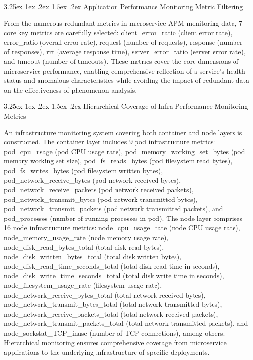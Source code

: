 \documentclass[10pt]{article}
\makeatletter
\renewcommand{\paragraph}{%
    \@startsection{paragraph}{4}{\z@}%
    {3.25ex \@plus1ex \@minus.2ex}%
    {1.5ex \@plus.2ex}%
    {\normalfont\normalsize\itshape}%
}
\makeatother
\begin{document}
\paragraph{Application Performance Monitoring Metric Filtering}

From the numerous redundant metrics in microservice APM monitoring data, 7 core key metrics are carefully selected: client\_error\_ratio (client error rate), error\_ratio (overall error rate), request (number of requests), response (number of responses), rrt (average response time), server\_error\_ratio (server error rate), and timeout (number of timeouts). These metrics cover the core dimensions of microservice performance, enabling comprehensive reflection of a service’s health status and anomalous characteristics while avoiding the impact of redundant data on the effectiveness of phenomenon analysis.

\paragraph{Hierarchical Coverage of Infra Performance Monitoring Metrics}

An infrastructure monitoring system covering both container and node layers is constructed. The container layer includes 9 pod infrastructure metrics: pod\_cpu\_usage (pod CPU usage rate), pod\_memory\_working\_set\_bytes (pod memory working set size), pod\_fs\_reads\_bytes (pod filesystem read bytes), pod\_fs\_writes\_bytes (pod filesystem written bytes), pod\_network\_receive\_bytes (pod network received bytes), pod\_network\_receive\_packets (pod network received packets), pod\_network\_transmit\_bytes (pod network transmitted bytes), pod\_network\_transmit\_packets (pod network transmitted packets), and pod\_processes (number of running processes in pod). The node layer comprises 16 node infrastructure metrics: node\_cpu\_usage\_rate (node CPU usage rate), node\_memory\_usage\_rate (node memory usage rate), node\_disk\_read\_bytes\_total (total disk read bytes), node\_disk\_written\_bytes\_total (total disk written bytes), node\_disk\_read\_time\_seconds\_total (total disk read time in seconds), node\_disk\_write\_time\_seconds\_total (total disk write time in seconds), node\_filesystem\_usage\_rate (filesystem usage rate), node\_network\_receive\_bytes\_total (total network received bytes), node\_network\_transmit\_bytes\_total (total network transmitted bytes), node\_network\_receive\_packets\_total (total network received packets), node\_network\_transmit\_packets\_total (total network transmitted packets), and node\_sockstat\_TCP\_inuse (number of TCP connections), among others. Hierarchical monitoring ensures comprehensive coverage from microservice applications to the underlying infrastructure of specific deployments.
\end{document}
